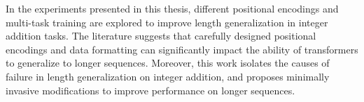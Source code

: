 In the experiments presented in this thesis, different positional encodings and multi-task training are explored to improve length generalization in integer addition tasks. The literature suggests that carefully designed positional encodings and data formatting can significantly impact the ability of transformers to generalize to longer sequences. Moreover, this work isolates the causes of failure in length generalization on integer addition, and proposes minimally invasive modifications to improve performance on longer sequences.
